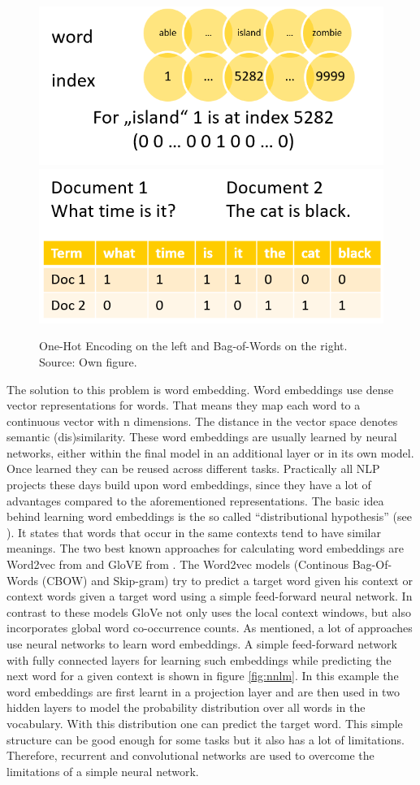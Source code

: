\documentclass[]{krantz}
\begin{document}
\begin{figure}
\includegraphics[width=0.5\linewidth]{figures/01-00-deep-learning-for-nlp/01-01_one-hot} \includegraphics[width=0.5\linewidth]{figures/01-00-deep-learning-for-nlp/01-01_bow} \caption{One-Hot Encoding on the left and Bag-of-Words on the right. Source: Own figure.}\label{fig:onehot-bow}
\end{figure}

The solution to this problem is word embedding. Word embeddings use dense vector representations for words. That means they map each word to a continuous vector with n dimensions. The distance in the vector space denotes semantic (dis)similarity. These word embeddings are usually learned by neural networks, either within the final model in an additional layer or in its own model. Once learned they can be reused across different tasks. Practically all NLP projects these days build upon word embeddings, since they have a lot of advantages compared to the aforementioned representations.
The basic idea behind learning word embeddings is the so called ``distributional hypothesis'' (see \citet{Harris.1954}). It states that words that occur in the same contexts tend to have similar meanings. The two best known approaches for calculating word embeddings are Word2vec from \citet{Mikolov.2013c} and GloVE from \citet{Pennington.2014}. The Word2vec models (Continous Bag-Of-Words (CBOW) and Skip-gram) try to predict a target word given his context or context words given a target word using a simple feed-forward neural network. In contrast to these models GloVe not only uses the local context windows, but also incorporates global word co-occurrence counts.
As mentioned, a lot of approaches use neural networks to learn word embeddings. A simple feed-forward network with fully connected layers for learning such embeddings while predicting the next word for a given context is shown in figure \ref{fig:nnlm}. In this example the word embeddings are first learnt in a projection layer and are then used in two hidden layers to model the probability distribution over all words in the vocabulary. With this distribution one can predict the target word. This simple structure can be good enough for some tasks but it also has a lot of limitations. Therefore, recurrent and convolutional networks are used to overcome the limitations of a simple neural network.
\end{document}
